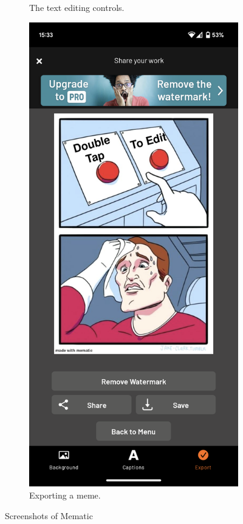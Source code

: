 \begin{figure}
\begin{subfigure}{0.3\textwidth}
        \caption{The text editing controls.}
        \label{fig:mematic-text-edit}
    \end{subfigure}
    \begin{subfigure}{0.3\textwidth}
        \centering
        \includegraphics[width=\linewidth]{text/img/mematic/export.png}
        \caption{Exporting a meme.}
        \label{fig:mematic-export}
    \end{subfigure}
    \caption{Screenshots of Mematic}
    \label{fig:mematic}
\end{figure}

